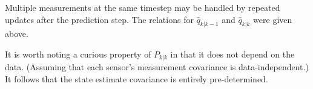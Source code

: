\documentclass[a4paper]{paper}
\begin{document}
Multiple measurements at the same timestep may be handled by repeated updates
after the prediction step. The relations for $\hat{q}_{k|k-1}$ and
$\hat{q}_{k|k}$ were given above.

It is worth noting a curious property of $P_{k|k}$ in that it does not depend
on the data. (Assuming that each sensor's measurement covariance is
data-independent.) It follows that the state estimate covariance is entirely
pre-determined.



\end{document}
